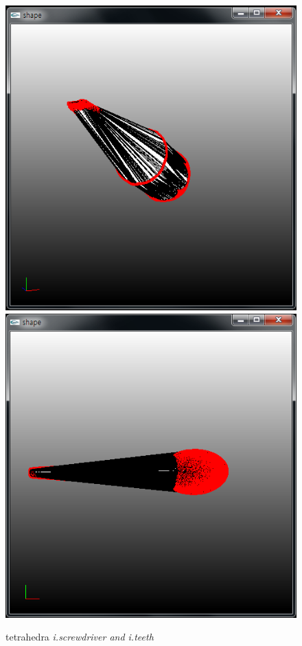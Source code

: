 \documentclass[11pt]{article}
\begin{document}
\begin{figure}[h]
\includegraphics[width=.5\textwidth]{FIGS/iscrewdriver-tetra}
\hspace{1cm}
\includegraphics[width=.5\textwidth]{FIGS/ispoon-tetra}
\caption{tetrahedra \textit{i.screwdriver and i.teeth}}
\end{figure}
\end{document}
